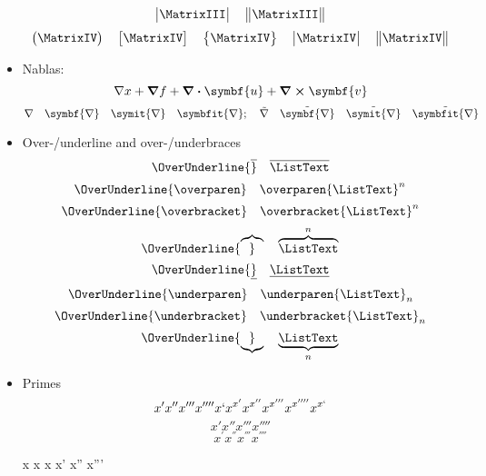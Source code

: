 \documentclass { article }
\begin{document}
\begin{itemize}
\[          \begin{vmatrix} \MatrixIII \end{vmatrix} \quad
          \begin{Vmatrix} \MatrixIII \end{Vmatrix}
        \]
        \[
          \begin{pmatrix} \MatrixIV  \end{pmatrix} \quad
          \begin{bmatrix} \MatrixIV  \end{bmatrix} \quad
          \begin{Bmatrix} \MatrixIV  \end{Bmatrix} \quad
          \begin{vmatrix} \MatrixIV  \end{vmatrix} \quad
          \begin{Vmatrix} \MatrixIV  \end{Vmatrix}
        \]
  \item Nablas:
        \[ \nabla x + \grad{f} + \divergence{\symbf{u}} + \curl{\symbf{v}} \]
        \[
          \nabla                 \quad \symbf{\nabla}           \quad
          \symit{\nabla}         \quad \symbfit{\nabla};        \quad
          \tilde{\nabla}         \quad \tilde{\symbf{\nabla}}   \quad
          \tilde{\symit{\nabla}} \quad \tilde{\symbfit{\nabla}}
        \]
  \item Over-/underline and over-/underbraces
        \[ \OverUnderline{\overline}     \quad \overline     {\ListText}   \]
        \[ \OverUnderline{\overparen}    \quad \overparen    {\ListText}^n \]
        \[ \OverUnderline{\overbracket}  \quad \overbracket  {\ListText}^n \]
        \[ \OverUnderline{\overbrace}    \quad \overbrace    {\ListText}^n \]
        \[ \OverUnderline{\underline}    \quad \underline    {\ListText}   \]
        \[ \OverUnderline{\underparen}   \quad \underparen   {\ListText}_n \]
        \[ \OverUnderline{\underbracket} \quad \underbracket {\ListText}_n \]
        \[ \OverUnderline{\underbrace}   \quad \underbrace   {\ListText}_n \]
  \item Primes
        \[ x' x'' x''' x'''' x` x^{x'} x^{x''} x^{x'''} x^{x''''} x^{x`} \]
        \[ x \prime x \dprime x \trprime x \qprime \]
        \[ x^{\prime} x^{\dprime} x^{\trprime} x^{\qprime} \] %
        \begin{center}
          \firatext x x x x' x'' x'''
        \end{center}
\end{itemize}
\end{document}
